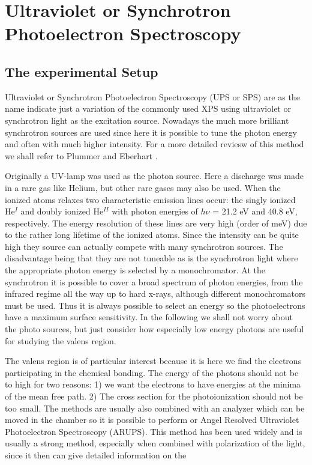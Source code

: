 \newpage
\chapter{Ultraviolet or Synchrotron Photoelectron Spectroscopy}
\section{The experimental Setup}



Ultraviolet or Synchrotron  Photoelectron Spectroscopy (UPS or SPS)  are as the name indicate just a variation of the commonly used XPS using ultraviolet or synchrotron light as the excitation source. Nowadays the much more brilliant synchrotron sources are used since here it is possible to tune the  photon energy and often with much higher intensity.  For a more detailed reviesw of this method we shall refer to Plummer and Eberhart \cite{Plummer}.

Originally a  UV-lamp was used as the photon source. Here a discharge was made in a rare gas like Helium, but other rare gases may also be used. When the ionized atoms relaxes two characteristic emission lines occur: the singly ionized He$^{I}$  and doubly ionized He$^{II}$ with photon energies of  $h\nu$ = 21.2 eV and 40.8 eV, respectively. The energy resolution of these lines are very high (order of meV) due to the rather long lifetime of the ionized atoms. Since the intensity can be quite high they source can actually  compete with many synchrotron sources. The disadvantage being that they are not tuneable as is the synchrotron light where the appropriate photon energy is selected by a monochromator. At the synchrotron it is possible to cover a broad spectrum of  photon energies, from the infrared regime all the way up to hard x-rays, although different monochromators must be used.  Thus it is always possible to select an energy so the photoelectrons have a maximum surface sensitivity. In the following we shall not worry about the photo sources, but just consider how especially low energy photons are useful for studying the valens region.

The valens region is of particular interest because it is here we find the electrons participating in the chemical bonding. The energy of the photons should not be to high for two reasons: 1) we want the electrons to have energies at the minima of the mean free path. 2) The cross section for the photoionization should not be too small. The methods are usually also combined with an analyzer which can be moved in the chamber so it is possible to perform or Angel Resolved Ultraviolet Photoelectron Spectroscopy (ARUPS). This method has been used widely and is usually a strong method, especially when combined with polarization of the light, since it then can give detailed information on the

